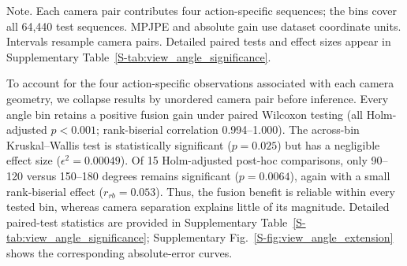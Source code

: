 \documentclass[preprint,12pt]{elsarticle}
\renewcommand{\textit}[1]{\textup{#1}}
\begin{document}
\begin{table}[t]
\centering
\caption{Accuracy and camera-pair bootstrap intervals by azimuth separation. Positive gain favors CanonFuse3D.}
\label{tab:view_angle}
\small
\setlength{\tabcolsep}{4pt}
\vspace{0.3em}
\begin{minipage}{0.97\linewidth}
\footnotesize\textit{Note.} Each camera pair contributes four action-specific sequences; the bins cover all 64,440 test sequences. MPJPE and absolute gain use dataset coordinate units. Intervals resample camera pairs. Detailed paired tests and effect sizes appear in Supplementary Table~\ref{S-tab:view_angle_significance}.
\end{minipage}
\end{table}



To account for the four action-specific observations associated with each camera geometry, we collapse results by unordered camera pair before inference. Every angle bin retains a positive fusion gain under paired Wilcoxon testing (all Holm-adjusted \(p<0.001\); rank-biserial correlation 0.994--1.000). The across-bin Kruskal--Wallis test is statistically significant (\(p=0.025\)) but has a negligible effect size (\(\epsilon^2=0.00049\)). Of 15 Holm-adjusted post-hoc comparisons, only 90--120 versus 150--180 degrees remains significant (\(p=0.0064\)), again with a small rank-biserial effect (\(r_{rb}=0.053\)). Thus, the fusion benefit is reliable within every tested bin, whereas camera separation explains little of its magnitude. Detailed paired-test statistics are provided in Supplementary Table~\ref{S-tab:view_angle_significance}; Supplementary Fig.~\ref{S-fig:view_angle_extension} shows the corresponding absolute-error curves.
\end{document}

